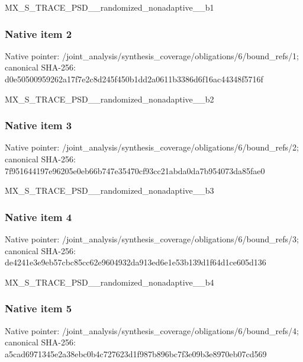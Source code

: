 \documentclass[10pt,a4paper]{article}
\begin{document}
\begingroup\raggedright\sloppy MX\_\allowbreak{}S\_\allowbreak{}TRACE\_\allowbreak{}PSD\_\allowbreak{}\_\allowbreak{}randomized\_\allowbreak{}nonadaptive\_\allowbreak{}\_\allowbreak{}b1\par\endgroup

\subsubsection{Native item 2}
Native pointer: /joint\_\allowbreak{}analysis/synthesis\_\allowbreak{}coverage/obligations/6/bound\_\allowbreak{}refs/1; canonical SHA-256: d0e50500959262a17f7e2c8d245f450b1dd2a0611b3386d6f16ac44348f5716f

\begingroup\raggedright\sloppy MX\_\allowbreak{}S\_\allowbreak{}TRACE\_\allowbreak{}PSD\_\allowbreak{}\_\allowbreak{}randomized\_\allowbreak{}nonadaptive\_\allowbreak{}\_\allowbreak{}b2\par\endgroup

\subsubsection{Native item 3}
Native pointer: /joint\_\allowbreak{}analysis/synthesis\_\allowbreak{}coverage/obligations/6/bound\_\allowbreak{}refs/2; canonical SHA-256: 7f951644197e96205e0eb66b747e35470cf93cc21abda0da7b954073da85fae0

\begingroup\raggedright\sloppy MX\_\allowbreak{}S\_\allowbreak{}TRACE\_\allowbreak{}PSD\_\allowbreak{}\_\allowbreak{}randomized\_\allowbreak{}nonadaptive\_\allowbreak{}\_\allowbreak{}b3\par\endgroup

\subsubsection{Native item 4}
Native pointer: /joint\_\allowbreak{}analysis/synthesis\_\allowbreak{}coverage/obligations/6/bound\_\allowbreak{}refs/3; canonical SHA-256: de4241e3e9eb57cbc85cc62e9604932da913ed6e1e53b139d1f64d1ce605d136

\begingroup\raggedright\sloppy MX\_\allowbreak{}S\_\allowbreak{}TRACE\_\allowbreak{}PSD\_\allowbreak{}\_\allowbreak{}randomized\_\allowbreak{}nonadaptive\_\allowbreak{}\_\allowbreak{}b4\par\endgroup

\subsubsection{Native item 5}
Native pointer: /joint\_\allowbreak{}analysis/synthesis\_\allowbreak{}coverage/obligations/6/bound\_\allowbreak{}refs/4; canonical SHA-256: a5cad6971345e2a38ebc0b4c727623d1f987b896bc7f3e09b3e8970eb07cd569
\end{document}
